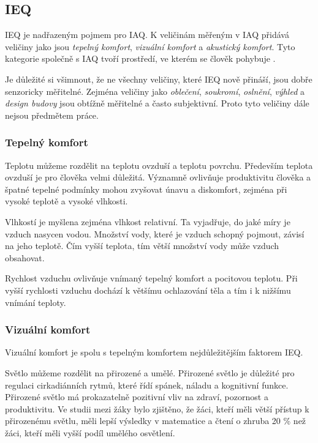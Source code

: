 \FloatBarrier
\subsection{IEQ}
IEQ je nadřazeným pojmem pro IAQ. K veličinám měřeným v IAQ přidává veličiny jako jsou \textit{tepelný komfort}, \textit{vizuální komfort} a \textit{akustický komfort}. Tyto kategorie společně s IAQ tvoří prostředí, ve kterém se člověk pohybuje \parencite{dengImpactIndoorAir2024}.

Je důležité si všimnout, že ne všechny veličiny, které IEQ nově přináší, jsou dobře senzoricky měřitelné. Zejména veličiny jako \textit{oblečení}, \textit{soukromí}, \textit{oslnění}, \textit{výhled} a \textit{design budovy} jsou obtížně měřitelné a často subjektivní. Proto tyto veličiny dále nejsou předmětem práce.

\FloatBarrier
\subsubsection{Tepelný komfort}
Teplotu můžeme rozdělit na teplotu ovzduší a teplotu povrchu. Především teplota ovzduší je pro člověka velmi důležitá. Významně ovlivňuje produktivitu člověka a špatné tepelné podmínky mohou zvyšovat únavu a diskomfort, zejména při vysoké teplotě a vysoké vlhkosti. \parencite{dengImpactIndoorAir2024} 

Vlhkostí je myšlena zejména vlhkost relativní. Ta vyjadřuje, do jaké míry je vzduch nasycen vodou. Množství vody, které je vzduch schopný pojmout, závisí na jeho teplotě. \parencite{dengImpactIndoorAir2024} Čím vyšší teplota, tím větší množství vody může vzduch obsahovat. \parencite{VlhkostVzduchu2024}

Rychlost vzduchu ovlivňuje vnímaný tepelný komfort a pocitovou teplotu. Při vyšší rychlosti vzduchu dochází k většímu ochlazování těla a tím i k nižšímu vnímání teploty. \parencite{dengImpactIndoorAir2024}
\FloatBarrier
\subsubsection{Vizuální komfort}
Vizuální komfort je spolu s tepelným komfortem nejdůležitějším faktorem IEQ.

Světlo můžeme rozdělit na přirozené a umělé. Přirozené světlo je důležité pro regulaci cirkadiánních rytmů, které řídí spánek, náladu a kognitivní funkce. Přirozené světlo má prokazatelně pozitivní vliv na zdraví, pozornost a produktivitu. Ve studii mezi žáky bylo zjištěno, že žáci, kteří měli větší přístup k přirozenému světlu, měli lepší výsledky v matematice a čtení o zhruba 20 \% než žáci, kteří měli vyšší podíl umělého osvětlení. \parencite{dengImpactIndoorAir2024} 

